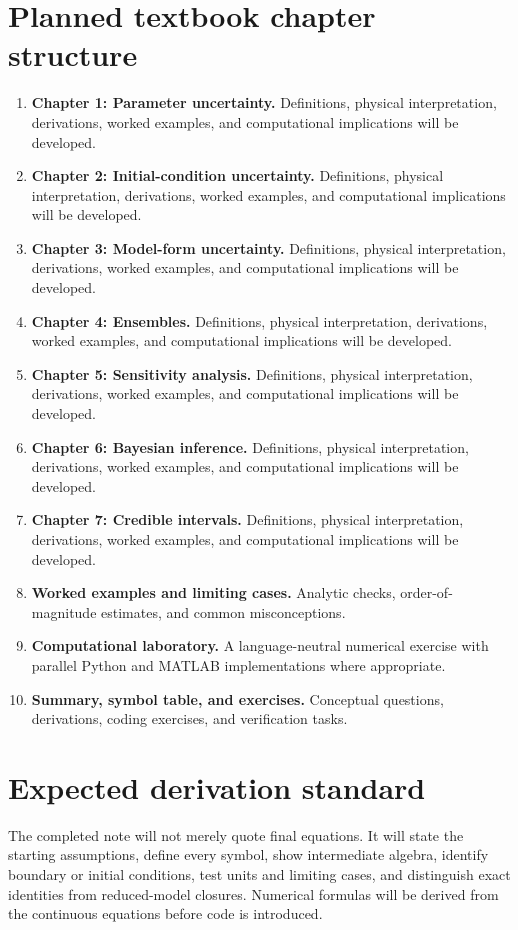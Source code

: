 \documentclass[11pt]{article}
\begin{document}
\section{Planned textbook chapter structure}
\begin{enumerate}[leftmargin=1.8em]
\item \textbf{Chapter 1: Parameter uncertainty.} Definitions, physical interpretation, derivations, worked examples, and computational implications will be developed.
\item \textbf{Chapter 2: Initial-condition uncertainty.} Definitions, physical interpretation, derivations, worked examples, and computational implications will be developed.
\item \textbf{Chapter 3: Model-form uncertainty.} Definitions, physical interpretation, derivations, worked examples, and computational implications will be developed.
\item \textbf{Chapter 4: Ensembles.} Definitions, physical interpretation, derivations, worked examples, and computational implications will be developed.
\item \textbf{Chapter 5: Sensitivity analysis.} Definitions, physical interpretation, derivations, worked examples, and computational implications will be developed.
\item \textbf{Chapter 6: Bayesian inference.} Definitions, physical interpretation, derivations, worked examples, and computational implications will be developed.
\item \textbf{Chapter 7: Credible intervals.} Definitions, physical interpretation, derivations, worked examples, and computational implications will be developed.
\item \textbf{Worked examples and limiting cases.} Analytic checks, order-of-magnitude estimates, and common misconceptions.
\item \textbf{Computational laboratory.} A language-neutral numerical exercise with parallel Python and MATLAB implementations where appropriate.
\item \textbf{Summary, symbol table, and exercises.} Conceptual questions, derivations, coding exercises, and verification tasks.
\end{enumerate}

\section{Expected derivation standard}
The completed note will not merely quote final equations. It will state the starting assumptions, define every symbol, show intermediate algebra, identify boundary or initial conditions, test units and limiting cases, and distinguish exact identities from reduced-model closures. Numerical formulas will be derived from the continuous equations before code is introduced.
\end{document}
